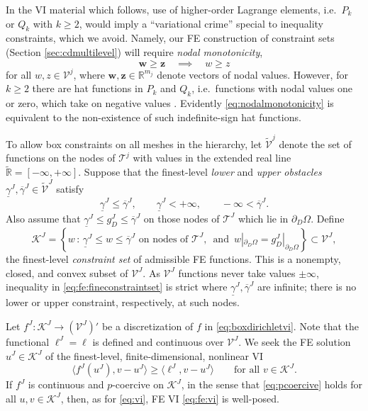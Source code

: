 \documentclass[letterpaper,final,12pt,reqno]{amsart}
\theoremstyle{cstyle}
\theoremstyle{cstyle*}
\theoremstyle{dstyle}
\numberwithin{equation}{section}
\numberwithin{figure}{section}
\numberwithin{table}{section}
\numberwithin{theorem}{section}
\newcommand{\RR}{\mathbb{R}}
\newcommand{\bw}{\mathbf{w}}
\newcommand{\bz}{\mathbf{z}}
\newcommand{\cK}{\mathcal{K}}
\newcommand{\ip}[2]{\langle#1,#2\rangle}
\begin{document}
In the VI material which follows, use of higher-order Lagrange elements, i.e.~$P_k$ or $Q_k$ with $k\ge 2$, would imply a ``variational crime'' \cite[Chapter 10]{BrennerScott2007} special to inequality constraints, which we avoid.  Namely, our FE construction of constraint sets (Section \ref{sec:cdmultilevel}) will require \emph{nodal monotonicity},
\begin{equation}
\bw \ge \bz \quad \implies \quad w \ge z \label{eq:nodalmonotonicity}
\end{equation}
for all $w,z \in \mathcal{V}^j$, where $\bw,\bz \in \RR^{m_j}$ denote vectors of nodal values.  However, for $k\ge 2$ there are hat functions in $P_k$ and $Q_k$, i.e.~functions with nodal values one or zero, which take on negative values \cite[Figure 1.7]{Elmanetal2014}.  Evidently \eqref{eq:nodalmonotonicity} is equivalent to the non-existence of such indefinite-sign hat functions.

To allow box constraints on all meshes in the hierarchy, let $\tilde{\mathcal{V}}^j$ denote the set of functions on the nodes of $\mathcal{T}^j$ with values in the extended real line $\tilde{\RR} = [-\infty,+\infty]$.  Suppose that the finest-level \emph{lower} and \emph{upper obstacles} $\underline{\gamma}^J, \overline{\gamma}^J \in \tilde{\mathcal{V}}^J$ satisfy
\begin{equation}
\underline{\gamma}^J \le \overline{\gamma}^J, \qquad \underline{\gamma}^J < +\infty, \qquad -\infty < \overline{\gamma}^J. \label{eq:fe:boxconstraintrequirements}
\end{equation}
Also assume that $\underline{\gamma}^J \le g_D^J \le \overline{\gamma}^J$ on those nodes of $\mathcal{T}^J$ which lie in $\partial_D \Omega$.  Define
\begin{equation}
\mathcal{K}^J = \left\{w\,:\,\underline{\gamma}^J \le w \le \overline{\gamma}^J \text{ on nodes of } \mathcal{T}^J, \, \text{ and } \, w|_{\partial_D\Omega} = g_D^J|_{\partial_D\Omega}\right\} \subset \mathcal{V}^J, \label{eq:fe:fineconstraintset}
\end{equation}
the finest-level \emph{constraint set} of admissible FE functions.  This is a nonempty, closed, and convex subset of $\mathcal{V}^J$.  As $\mathcal{V}^J$ functions never take values $\pm\infty$, inequality in \eqref{eq:fe:fineconstraintset} is strict where $\underline{\gamma}^J, \overline{\gamma}^J$ are infinite; there is no lower or upper constraint, respectively, at such nodes.

Let $f^J:\mathcal{K}^J \to (\mathcal{V}^J)'$ be a discretization of $f$ in \eqref{eq:boxdirichletvi}.  Note that the functional $\ell^J=\ell$ is defined and continuous over $\mathcal{V}^J$.  We seek the FE solution $u^J \in \mathcal{K}^J$ of the finest-level, finite-dimensional, nonlinear VI
\begin{equation}
\ip{f^J(u^J)}{v-u^J} \ge \ip{\ell^J}{v-u^J} \qquad \text{for all } v\in \cK^J. \label{eq:fe:vi}
\end{equation}
If $f^J$ is continuous and $p$-coercive on $\mathcal{K}^J$, in the sense that \eqref{eq:pcoercive} holds for all $u,v \in \mathcal{K}^J$, then, as for \eqref{eq:vi}, FE VI \eqref{eq:fe:vi} is well-posed.
\end{document}
